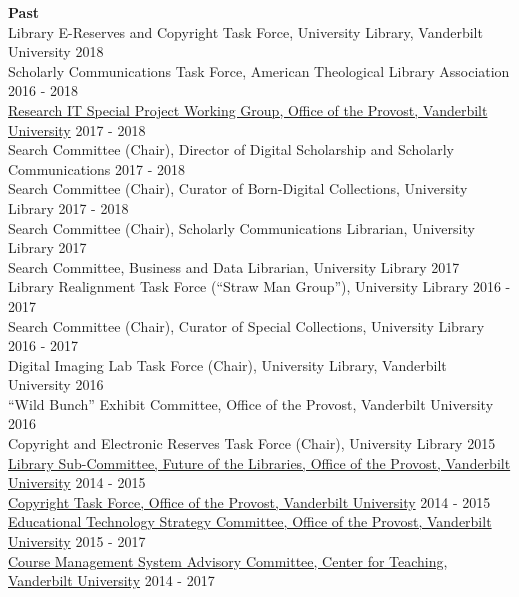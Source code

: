 \documentclass[10pt]{res} %
\begin{document}
\begin{resume}
{\bf Past} \\
Library E-Reserves and Copyright Task Force, University Library, Vanderbilt University \hfill 2018 \\
Scholarly Communications Task Force, American Theological Library Association \hfill 2016 - 2018 \\
\href{https://news.vanderbilt.edu/2017/03/17/new-working-group-to-assess-and-prioritize-opportunities-for-enhancing-research-it-resources-on-campus/}{Research IT Special Project Working Group, Office of the Provost, Vanderbilt University} \hfill 2017 - 2018 \\
Search Committee (Chair), Director of Digital Scholarship and Scholarly Communications \hfill 2017 - 2018 \\
Search Committee (Chair), Curator of Born-Digital Collections, University Library \hfill 2017 - 2018 \\
Search Committee (Chair), Scholarly Communications Librarian, University Library \hfill 2017 \\
Search Committee, Business and Data Librarian, University Library \hfill 2017 \\
Library Realignment Task Force (“Straw Man Group”), University Library \hfill 2016 - 2017 \\
Search Committee (Chair), Curator of Special Collections, University Library \hfill 2016 - 2017 \\
Digital Imaging Lab Task Force (Chair), University Library, Vanderbilt University \hfill 2016 \\
“Wild Bunch” Exhibit Committee, Office of the Provost, Vanderbilt University \hfill 2016 \\
Copyright and Electronic Reserves Task Force (Chair), University Library \hfill 2015 \\
\href{https://www.library.vanderbilt.edu/future/}{Library Sub-Committee, Future of the Libraries, Office of the Provost, Vanderbilt University} \hfill 2014 - 2015 \\
\href{http://news.vanderbilt.edu/2015/09/new-videos-on-copyright-law-help-users- balance-fair-use-considerations/}{Copyright Task Force, Office of the Provost, Vanderbilt University} \hfill 2014 - 2015 \\
\href{https://www.vanderbilt.edu/provost/committees/edtechstrategy.php}{Educational Technology Strategy Committee, Office of the Provost, Vanderbilt University} \hfill 2015 - 2017 \\
\href{https://www.vanderbilt.edu/blackboard/about/advisory-committee/}{Course Management System Advisory Committee, Center for Teaching, Vanderbilt University} \hfill 2014 - 2017 \\

\end{resume}
\end{document}
